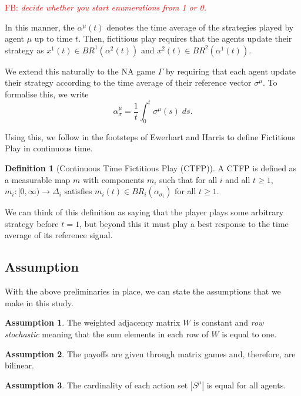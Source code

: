 \documentclass{article}
\theoremstyle{definition}
\newtheorem*{definition}{Definition}
\newtheorem{assumption}{Assumption}
\newcommand{\fb}[1]{\textcolor{red}{FB: \textit{#1}}}
\newcommand{\weightset}{W}
\newcommand{\actionset}[1]{S^{#1}}
\newcommand{\refmu}{\sigma^{\mu}}
\newcommand{\avgref}[1]{\alpha_\sigma^{#1}}
\begin{document}
        \fb{decide whether you start enumerations from 1 or 0.}


	In this manner, the $\alpha^\mu(t)$ denotes the time average of the strategies played by agent
	$\mu$ up to time $t$. Then, fictitious play requires that the agents update their strategy as
	$x^1(t) \in BR^1(\alpha^2(t))$ and $x^2(t) \in
	BR^2(\alpha^1(t))$. 

	We extend this naturally to the NA game $\Gamma$ by requiring that each agent update their
	strategy according to the time average of their reference vector $\refmu$. To formalise this, we
	write
	\begin{equation}
		\avgref{\mu} = \frac{1}{t} \int_0^t \refmu(s) \; ds.
	\end{equation}

	Using this, we follow in the footsteps of Ewerhart \cite{} and Harris \cite{} to define
	Fictitious Play in continuous time.
%
	\begin{definition}[Continuous Time Fictitious Play (CTFP)]
		A CTFP is defined as a measurable map $m$ with components $m_i$ such that for all $i$ and all $t \geq 1$, $m_i: [0, \infty) \rightarrow \Delta_i$ satisfies $m_i(t) \in BR_i(\alpha_{\sigma_i})$ for all $t \geq 1$.
	\end{definition}

		We can think of this definition as saying that the player plays some arbitrary strategy before $t = 1$, but beyond this it must play a best response to the time average of its reference signal.

	\subsection{Assumption}

	With the above preliminaries in place, we can state the assumptions that we make in this study.

	\begin{assumption}
		The weighted adjacency matrix $\weightset$ is constant and \emph{row stochastic} meaning
		that the sum elements in each row of $\weightset$ is equal to one.
	\end{assumption}

	\begin{assumption}
		The payoffs are given through matrix games and, therefore, are bilinear.
	\end{assumption}

	\begin{assumption}
		The cardinality of each action set $|\actionset{\mu}|$ is equal for all agents.
	\end{assumption}
\end{document}
